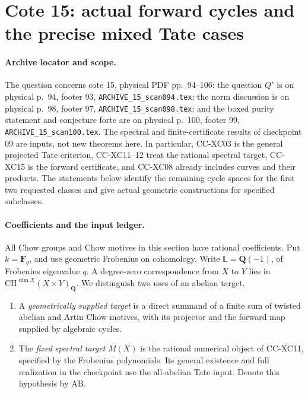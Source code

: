 \section{Cote 15: actual forward cycles and the precise mixed Tate cases}
\label{arch15-core}

\paragraph{Archive locator and scope.}
The question concerns cote 15, physical PDF pp.~94--106: the question
\(Q'\) is on physical p.~94, footer 93,
\texttt{ARCHIVE\_15\_scan094.tex}; the norm discussion is on physical
p.~98, footer 97, \texttt{ARCHIVE\_15\_scan098.tex}; and the boxed purity
statement and conjecture forte are on physical p.~100, footer 99,
\texttt{ARCHIVE\_15\_scan100.tex}.  The spectral and finite-certificate
results of checkpoint 09 are inputs, not new theorems here. In particular,
CC-XC03 is the general projected Tate criterion, CC-XC11--12 treat the
rational spectral target, CC-XC15 is the forward certificate, and CC-XC08
already includes curves and their products. The statements below identify
the remaining cycle spaces for the first two requested classes and give
actual geometric constructions for specified subclasses.

\paragraph{Coefficients and the input ledger.}
All Chow groups and Chow motives in this section have rational
coefficients. Put \(k=\mathbf F_q\), and use geometric Frobenius on
cohomology. Write \(\mathbb L=\mathbf Q(-1)\), of Frobenius eigenvalue
\(q\). A degree-zero correspondence from \(X\) to \(Y\) lies in
\(\mathrm{CH}^{\dim X}(X\times Y)_{\mathbf Q}\).
We distinguish two uses of an abelian target.

\begin{enumerate}
\item A \emph{geometrically supplied target} is a direct summand of a
finite sum of twisted abelian and Artin Chow motives, with its projector
and the forward map supplied by algebraic cycles.
\item The \emph{fixed spectral target} \(M(X)\) is the rational numerical
object of CC-XC11, specified by the Frobenius polynomials. Its general
existence and full realization in the checkpoint use the all-abelian Tate
input. Denote this hypothesis by \(\mathrm{AB}\).
\end{enumerate}

